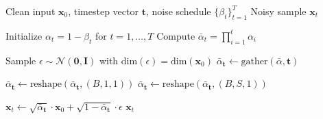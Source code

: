 \begin{algorithm}
\caption{Forward Diffusion Sampling}
\label{alg:forward_diffusion}
\begin{algorithmic}[1]
\Require Clean input $\mathbf{x}_0$, timestep vector $\mathbf{t}$, noise schedule $\{\beta_t\}_{t=1}^T$
\Ensure Noisy sample $\mathbf{x}_t$

\State Initialize $\alpha_t = 1 - \beta_t$ for $t = 1,\dots,T$
\State Compute $\bar{\alpha}_t = \prod_{i=1}^{t} \alpha_i$ 

\State Sample $\epsilon \sim \mathcal{N}(\mathbf{0}, \mathbf{I})$ with $\text{dim}(\epsilon) = \text{dim}(\mathbf{x}_0)$
\State $\bar{\alpha}_{\mathbf{t}} \leftarrow \text{gather}(\bar{\alpha}, \mathbf{t})$ 

    \State $\bar{\alpha}_{\mathbf{t}} \leftarrow \text{reshape}(\bar{\alpha}_{\mathbf{t}}, (B, 1, 1))$
\Else 
    \State $\bar{\alpha}_{\mathbf{t}} \leftarrow \text{reshape}(\bar{\alpha}_{\mathbf{t}}, (B, S, 1))$ 
\EndIf

\State $\mathbf{x}_t \leftarrow \sqrt{\bar{\alpha}_{\mathbf{t}}} \cdot \mathbf{x}_0 + \sqrt{1 - \bar{\alpha}_{\mathbf{t}}} \cdot \epsilon$
\State \Return $\mathbf{x}_t$
\end{algorithmic}
\end{algorithm}


